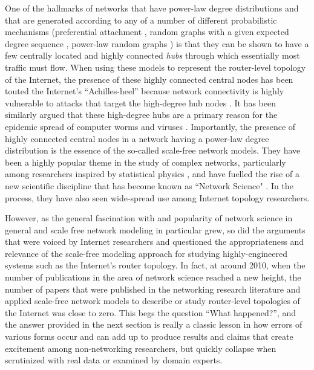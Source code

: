 One of the hallmarks of networks that have power-law degree
distributions and that are generated according to any of a number of
different probabilistic mechanisms (\eg preferential attachment
\cite{barabasi99}, random graphs with a given expected degree sequence
\cite{Chung04}, power-law random graphs 
\cite{Aiello00}) is that they can be shown to have
a few centrally located and highly connected {\em hubs} through which
essentially most traffic must flow.  When using these models to
represent the router-level topology of the Internet, the presence of
these highly connected central nodes has been touted the Internet's
``Achilles-heel'' because network connectivity is highly vulnerable to
attacks that target the high-degree hub nodes \cite{barabasi00}. It has been
similarly argued that these high-degree hubs are a primary reason for
the epidemic spread of computer worms and viruses \cite{berger05:_spread_of_viruses,pastor-satorras01:_epidem}.
Importantly, the presence of highly connected central nodes in a
network having a power-law degree distribution is the essence of the
so-called scale-free network models. They have been a highly popular
theme in the study of complex networks, particularly among researchers
inspired by statistical physics \cite{albert_barabasi02}, and have fuelled the rise of
a new scientific discipline that has become known as ``Network
Science" \cite{barabasi12}.  In the process, they have also seen wide-spread
use among Internet topology researchers.

However, as the general fascination with and popularity of network
science in general and scale free network modeling in particular grew,
so did the arguments that were voiced by Internet researchers
and questioned the appropriateness and relevance of the scale-free
modeling approach for studying highly-engineered systems such as the
Internet's router topology. In fact, at around 2010, when the number
of publications in the area of network science reached a new height,
the number of papers that were published in the networking research
literature and applied scale-free network models to describe or study
router-level topologies of the Internet was close to zero.  This begs
the question ``What happened?'', and the answer provided in the next
section is really a classic lesson in how errors of various forms
occur and can add up to produce results and claims that create
excitement among non-networking researchers, but quickly collapse when
scrutinized with real data or examined by domain experts.



